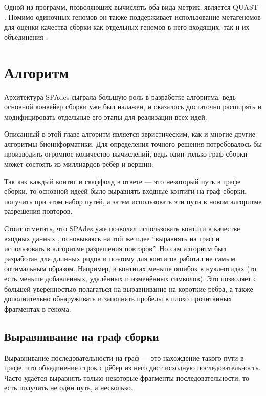 \documentclass[14pt]{matmex-diploma-custom}
\begin{document}
Одной из программ, позволяющих вычислять оба вида метрик, является QUAST \cite{art:QUAST}. Помимо одиночных геномов он также поддерживает использование  метагеномов для оценки качества сборки как отдельных геномов в него входящих, так и их объединения \cite{art:metaquast}.

\section{Алгоритм}
Архитектура SPAdes сыграла большую роль в разработке алгоритма, ведь основной конвейер сборки уже был налажен, и оказалось достаточно расширять и модифицировать отдельные его этапы для реализации всех идей. 

Описанный в этой главе алгоритм является эвристическим, как и многие другие алгоритмы биоинформатики. Для определения точного решения потребовалось бы производить огромное количество вычислений, ведь один только граф сборки может состоять из миллиардов рёбер и вершин.

Так как каждый контиг и скаффолд в ответе --- это некоторый путь в графе сборки, то основной идеей было выравнять входные контиги на граф сборки, получить при этом набор путей, а затем использовать эти пути в новом алгоритме разрешения повторов.

Стоит отметить, что SPAdes уже позволял использовать контиги в качестве входных данных \cite{art:hybridspades}, основываясь на той же идее ``выравнять на граф и использовать в алгоритме разрешения повторов''. Но сам алгоритм был разработан для  длинных ридов и поэтому для контигов работал не самым оптимальным образом. Например, в контигах меньше ошибок в нуклеотидах (то есть меньше добавленных, удалённых и изменённых символов). Это позволяет с большей уверенностью полагаться на выравнивание на короткие рёбра, а также дополнительно обнаруживать и заполнять пробелы в плохо прочитанных фрагментах в генома.

\subsection{Выравнивание на граф сборки}
Выравнивание последовательности на граф --- это нахождение такого пути в графе, что объединение строк с рёбер из него даст исходную последовательность. Часто удаётся выравнять только некоторые фрагменты последовательности, то есть получить не один путь, а несколько.
\end{document}
